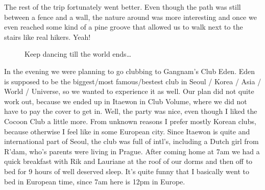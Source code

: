 \begin{post}
\begin{content}
The rest of the trip fortunately went better. Even though the path was still between a fence and a wall, the nature around was more interesting and once we even reached some kind of a pine groove that allowed us to walk next to the stairs like real hikers. Yeah!

\begin{figure}[h]
\centering
{}
\end{figure}

\clearpage

\begin{figure}
\centering{}
\caption{Keep dancing till the world ends{\ldots}}
\vspace{-12pt}
\end{figure}In the evening we were planning to go clubbing to Gangnam's Club Eden. Eden is supposed to be the biggest/most famous/bestest club in Seoul / Korea / Asia / World / Universe, so we wanted to experience it as well. Our plan did not quite work out, because we ended up in Itaewon in Club Volume, where we did not have to pay the cover to get in. Well, the party was nice, even though I liked the Cocoon Club a little more. From unknown reasons I prefer mostly Korean clubs, because otherwise I feel like in some European city. Since Itaewon is quite and international part of Seoul, the club was full of intl's, including a Dutch girl from R'dam, who's parents were living in Prague. After coming home at 7am we had a quick breakfast with Rik and Lauriane at the roof of our dorms and then off to bed for 9 hours of well deserved sleep. It's quite funny that I basically went to bed in European time, since 7am here is 12pm in Europe.


\end{content}
\end{post}
